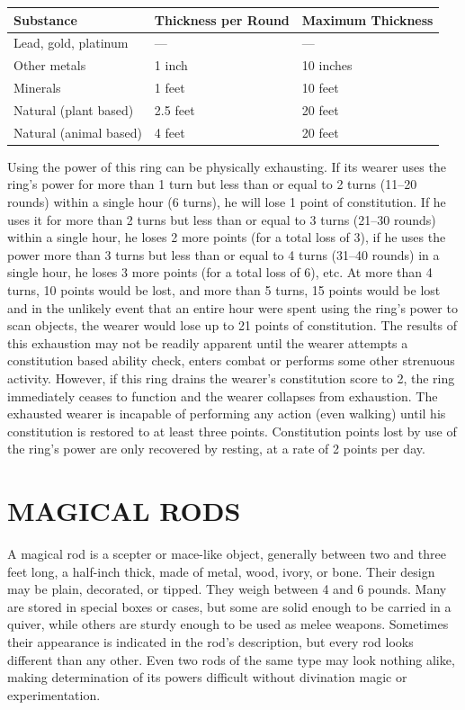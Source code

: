 \begin{multicols}{2}
\noindent
\begin{tabular}{|p{}|p{}|p{}|}
\hline
Substance	& Thickness per Round	& Maximum Thickness \\
\hline\hline
\rowcolor[gray]{.9}Lead, gold, platinum	& ---	& --- \\
Other metals	& 1 inch	& 10 inches \\
\rowcolor[gray]{.9}Minerals	& 1 feet	& 10 feet \\
Natural (plant based)	& 2.5 feet	& 20 feet \\
\rowcolor[gray]{.9}Natural (animal based)	& 4 feet	& 20 feet \\
\hline
\end{tabular}

Using the power of this ring can be physically exhausting.  If its wearer uses the ring's power for more than 1 turn but less than or equal to 2 turns (11--20 rounds) within a single hour (6 turns), he will lose 1 point of constitution.  If he uses it for more than 2 turns but less than or equal to 3 turns (21--30 rounds) within a single hour, he loses 2 more points (for a total loss of 3), if he uses the power more than 3 turns but less than or equal to 4 turns (31--40 rounds) in a single hour, he loses 3 more points (for a total loss of 6), etc.  At more than 4 turns, 10 points would be lost, and more than 5 turns, 15 points would be lost and in the unlikely event that an entire hour were spent using the ring's power to scan objects, the wearer would lose up to 21 points of constitution.  The results of this exhaustion may not be readily apparent until the wearer attempts a constitution based ability check, enters combat or performs some other strenuous activity.  However, if this ring drains the wearer's constitution score to 2, the ring immediately ceases to function and the wearer collapses from exhaustion.  The exhausted wearer is incapable of performing any action (even walking) until his constitution is restored to at least three points.  Constitution points lost by use of the ring's power are only recovered by resting, at a rate of 2 points per day.

\section{MAGICAL RODS}

A magical rod is a scepter or mace-like object, generally between two and three feet long, a half-inch thick, made of metal, wood, ivory, or bone.  Their design may be plain, decorated, or tipped.  They weigh between 4 and 6 pounds.  Many are stored in special boxes or cases, but some are solid enough to be carried in a quiver, while others are sturdy enough to be used as melee weapons.  Sometimes their appearance is indicated in the rod's description, but every rod looks different than any other.  Even two rods of the same type may look nothing alike, making determination of its powers difficult without divination magic or experimentation.


\end{multicols}
